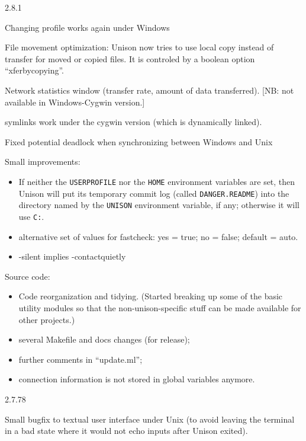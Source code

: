\begin{changesfromversion}{2.8.1}
\item Changing profile works again under Windows
\item File movement optimization: Unison now tries to use local copy instead of
  transfer for moved or copied files.  It is controled by a boolean option
  ``xferbycopying''.
\item Network statistics window (transfer rate, amount of data transferred).
      [NB: not available in Windows-Cygwin version.]
\item symlinks work under the cygwin version (which is dynamically linked).
\item Fixed potential deadlock when synchronizing between Windows and
Unix
\item Small improvements:
  \begin{itemize}
  \item If neither the {\tt USERPROFILE} nor the {\tt HOME} environment
    variables are set, then Unison will put its temporary commit log
    (called {\tt DANGER.README}) into the directory named by the
    {\tt UNISON} environment variable, if any; otherwise it will use
    {\tt C:}.
  \item alternative set of values for fastcheck: yes = true; no = false;
  default = auto.
  \item -silent implies -contactquietly
  \end{itemize}
\item Source code:
  \begin{itemize}
  \item Code reorganization and tidying.  (Started breaking up some of the
    basic utility modules so that the non-unison-specific stuff can be
    made available for other projects.)
  \item several Makefile and docs changes (for release);
  \item further comments in ``update.ml'';
  \item connection information is not stored in global variables anymore.
  \end{itemize}
\end{changesfromversion}

\begin{changesfromversion}{2.7.78}
\item Small bugfix to textual user interface under Unix (to avoid leaving
  the terminal in a bad state where it would not echo inputs after Unison
  exited).
\end{changesfromversion}

